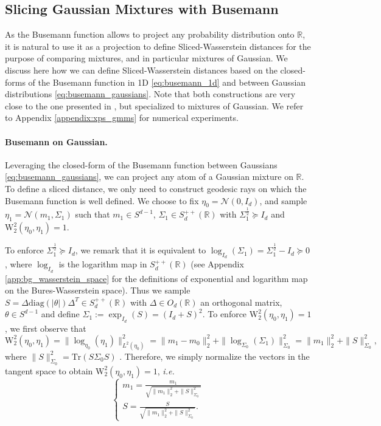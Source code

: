 \documentclass[twoside]{article}
\newcommand{\cN}{\mathcal{N}}
\newcommand{\W}{\mathrm{W}}
\newcommand{\R}{\mathbb{R}}
\newcommand{\tr}{\mathrm{Tr}}
\begin{document}
\subsection{Slicing Gaussian Mixtures with Busemann}

As the Busemann function allows to project any probability distribution onto $\R$, it is natural to use it as a projection to define Sliced-Wasserstein distances for the purpose of comparing mixtures, and in particular mixtures of Gaussian. We discuss here how we can define Sliced-Wasserstein distances based on the closed-forms of the Busemann function in 1D \eqref{eq:busemann_1d} and between Gaussian distributions \eqref{eq:busemann_gaussians}. Note that both constructions are very close to the one presented in , but specialized to mixtures of Gaussian. We refer to Appendix \ref{appendix:xps_gmms} for numerical experiments.


\paragraph{Busemann on Gaussian.} Leveraging the closed-form of the Busemann function between Gaussians \eqref{eq:busemann_gaussians}, we can project any atom of a Gaussian mixture on $\R$. To define a sliced distance, we only need to construct geodesic rays on which the Busemann function is well defined. We choose to fix $\eta_0=\cN(0,I_d)$, and sample $\eta_1=\cN(m_1,\Sigma_1)$ such that $m_1\in S^{d-1}$, $\Sigma_1\in S_d^{++}(\R)$ with $\Sigma_1^{\frac12}\succeq I_d$ and $\W_2^2(\eta_0, \eta_1)=1$. 

To enforce $\Sigma_1^{\frac12}\succeq I_d$, we remark that it is equivalent to $\log_{I_d}(\Sigma_1) = \Sigma_1^{\frac12} - I_d \succeq 0$, where $\log_{I_d}$ is the logarithm map in $S_d^{++}(\R)$ (see Appendix \ref{app:bg_wasserstein_space} for the definitions of exponential and logarithm map on the Bures-Wasserstein space). Thus we sample $S=\Delta\mathrm{diag}(|\theta|)\Delta^T\in S_d^{++}(\R)$ with $\Delta\in O_d(\R)$ an orthogonal matrix, $\theta \in S^{d-1}$ and define $\Sigma_1 := \exp_{I_d}(S) = (I_d + S)^2$.
To enforce $\W_2^2(\eta_0,\eta_1)=1$, we first observe that
\begin{equation}
    \W_2^2(\eta_0,\eta_1) = \|\log_{\eta_0}(\eta_1)\|_{L^2(\eta_0)}^2 = \|m_1-m_0\|_2^2 + \|\log_{\Sigma_0}(\Sigma_1)\|_{\Sigma_0}^2 = \|m_1\|_2^2 + \|S\|_{\Sigma_0}^2,
\end{equation}
where $\|S\|_{\Sigma_0}^2 = \tr(S\Sigma_0 S)$ \citep{takatsu2011wasserstein}. Therefore, we simply normalize the vectors in the tangent space to obtain $\W_2^2(\eta_0,\eta_1)=1$, \emph{i.e.}
\begin{equation}
    \begin{cases}
        m_1 = \frac{m_1}{\sqrt{\|m_1\|_2^2 + \|S\|_{\Sigma_0}^2}} \\
        S = \frac{S}{\sqrt{\|m_1\|_2^2 + \|S\|_{\Sigma_0}^2}}.
    \end{cases}
\end{equation}
\end{document}
